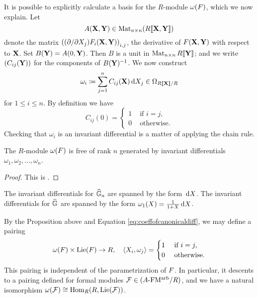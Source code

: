 \documentclass[../main.tex]{subfiles}
\begin{document}
It is possible to explicitly calculate a basis for the $R$-module
$\omega({F})$, which we now explain. Let 
$$A(\mathbf{X}, \mathbf{Y}) \in \operatorname{Mat}_{n \times n} (R\llbracket \mathbf{X}, \mathbf{Y} \rrbracket)$$ 
denote the matrix $\left((\partial/\partial X_j)F_i (\mathbf{X},\mathbf{Y})\right)_{i,j}$,
the derivative of ${F}(\mathbf{X},\mathbf{Y})$ with respect to $\mathbf{X}$. Set 
$B(\mathbf{Y}) = A(0,\mathbf{Y})$. Then $B$ is a unit in $\operatorname{Mat}_{n \times n} R\llbracket \mathbf{Y} \rrbracket$; 
and we write $(C_{ij}(\mathbf{Y}))$ for the components of 
$B(\mathbf{Y})^{-1}$. We now construct 
$$\omega_{i} \coloneqq \sum_{j=1}^n C_{ij}(\mathbf{X}) \, \mathrm{d} X_j \in \Omega_{R\llbracket \mathbf{X} \rrbracket/R}$$ 
for $1 \leq i \leq n$. By definition we have 
\begin{equation}\label{eq:coeffofcanonicaldiff}
  C_{ij}(0) = \begin{cases}
    1 &\text{ if }i = j,\\
    0 &\text{ otherwise.}
  \end{cases}
\end{equation}
Checking that $\omega_{i}$ is an invariant differential is a matter of
applying the chain rule. 
\begin{prop}
    The $R$-module $\omega({F})$ is free of rank $n$ generated by invariant differentials
    $\omega_{1}, \omega_{2}, \dots, \omega_{n}$.
\begin{proof}
  This is \cite[Proposition 1.1]{1970HondaFormalGroups}. 
\end{proof}
\end{prop}
\begin{xpl}
  The invariant differentials for $\widehat{\mathbb{G}}_a$ are spanned by the form $\, \mathrm{d} X$. 
  The invariant differentials for $\widehat{\mathbb{G}}$ are spanned by the form 
  $\omega_1(X) = \frac 1{1+X} \, \mathrm{d} X$.
\end{xpl}
By the Proposition above and Equation \eqref{eq:coeffofcanonicaldiff}, we may
define a pairing
\begin{equation*}
  \omega({F}) \times \operatorname{Lie}({F}) \to R, \quad \langle X_i, \omega_j \rangle =
  \begin{cases}
    1 &\text{ if } i = j,\\
    0 &\text{ otherwise.}
  \end{cases}
\end{equation*}
This pairing is independent of the parametrization of ${F}$. In particular, it
descents to a pairing defined for formal modules $\mathcal{F} \in {({A}\text-\allowbreak\mathrm{FM^{arb}}/{R})}$, and
we have a natural isomorphism $\omega(\mathcal{F}) \cong \operatorname{Hom}_R(R, \operatorname{Lie}(\mathcal{F}))$.
\end{document}
